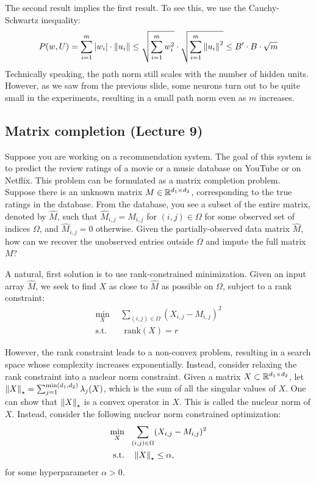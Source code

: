 \begin{remark}
    The second result implies the first result. To see this, we use the Cauchy-Schwartz inequality:
    \[ P(w, U) = \sum_{i=1}^m \left\lvert w_i\right\rvert \cdot \left\| u_i \right\| \le \sqrt{\sum_{i=1}^m w_i^2} \cdot \sqrt{\sum_{i=1}^m \left\| u_i \right\|^2} \le B' \cdot B \cdot \sqrt m \]
    Technically speaking, the path norm still scales with the number of hidden units.
    However, as we saw from the previous slide, some neurons turn out to be quite small in the experiments, resulting in a small path norm even as $m$ increases.
\end{remark}


\subsection{Matrix completion (Lecture 9)}\label{sec_mc}

Suppose you are working on a recommendation system. The goal of this system is to predict the review ratings of a movie or a music database on YouTube or on Netflix.
This problem can be formulated as a matrix completion problem.
Suppose there is an unknown matrix $M \in \mathbb{R}^{d_1 \times d_2}$, corresponding to the true ratings in the database.
From the database, you see a subset of the entire matrix, denoted by $\widehat M$, such that $\widehat M_{i, j} = M_{i, j}$ for $(i, j) \in \Omega$ for some observed set of indices $\Omega$, and $\widehat M_{i, j} = 0$ otherwise.
Given the partially-observed data matrix $\widehat M$, how can we recover the unobserved entries outside $\Omega$ and impute the full matrix $M$?

A natural, first solution is to use rank-constrained minimization.
Given an input array $\widehat M$, we seek to find $X$ as close to $\widehat M$ as possible on $\Omega$, subject to a rank constraint:
\begin{align*}
    \min_{X} &~~ \sum_{(i, j) \in \Omega}  (X_{i, j} - M_{i, j})^2 \\
    \mbox{s.t.} &~~~~ \text{rank}(X) = r
\end{align*}

However, the rank constraint leads to a non-convex problem, resulting in a search space whose complexity increases exponentially.
Instead, consider relaxing the rank constraint into a nuclear norm constraint.
Given a matrix $X \subset \mathbb{R}^{d_1 \times d_2}$, let $\left\| X \right\|_{\star} = \sum_{j=1}^{\min(d_1, d_2)} \lambda_j(X)$, which is the sum of all the singular values of $X$.
One can show that $\left\| X \right\|_{\star}$ is a convex operator in $X$. This is called the nuclear norm of $X$. %
Instead, consider the following nuclear norm constrained optimization:
\begin{align}
    \min_{X} &~~ \sum_{(i, j) \in \Omega} (X_{i, j} - M_{i, j})^2 \label{eq_nuclear} \\
    \mbox{s.t.} &~~~ \left\| X \right\|_{\star} \le \alpha, \nonumber
\end{align}
for some hyperparameter $\alpha > 0$.

